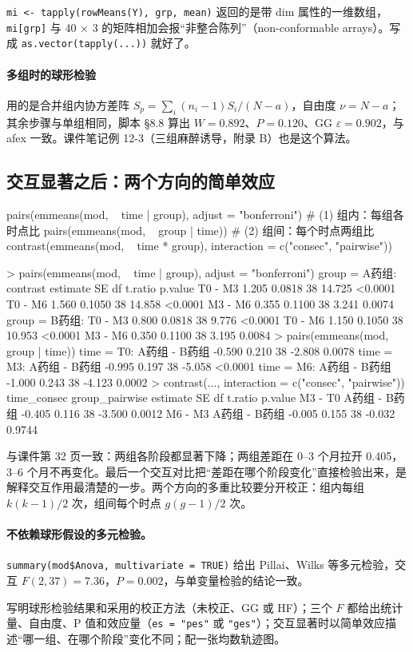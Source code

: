 \begin{notebox}
\Verb|mi <- tapply(rowMeans(Y), grp, mean)| 返回的是带 dim 属性的一维数组，\Verb|mi[grp]| 与 40 × 3 的矩阵相加会报“非整合陈列”（non-conformable arrays）。写成 \Verb|as.vector(tapply(...))| 就好了。
\end{notebox}

\paragraph{多组时的球形检验}用的是合并组内协方差阵 $S_p=\sum_i(n_i-1)S_i/(N-a)$，自由度 $\nu=N-a$；其余步骤与单组相同，脚本 §8.8 算出 $W=0.892$、$P=0.120$、GG $\varepsilon=0.902$，与 afex 一致。课件笔记例 12-3（三组麻醉诱导，附录 B）也是这个算法。

\subsection{交互显著之后：两个方向的简单效应}
\begin{RCode}[R · emmeans]
pairs(emmeans(mod, ~ time | group), adjust = "bonferroni")   # (1) 组内：每组各时点比
pairs(emmeans(mod, ~ group | time))                          # (2) 组间：每个时点两组比
contrast(emmeans(mod, ~ time * group), interaction = c("consec", "pairwise"))
\end{RCode}
\begin{ROut}
> pairs(emmeans(mod, ~ time | group), adjust = "bonferroni")
group = A药组:
 contrast estimate     SE df t.ratio p.value
 T0 - M3     1.205 0.0818 38  14.725 <0.0001
 T0 - M6     1.560 0.1050 38  14.858 <0.0001
 M3 - M6     0.355 0.1100 38   3.241  0.0074
group = B药组:
 T0 - M3     0.800 0.0818 38   9.776 <0.0001
 T0 - M6     1.150 0.1050 38  10.953 <0.0001
 M3 - M6     0.350 0.1100 38   3.195  0.0084
> pairs(emmeans(mod, ~ group | time))
time = T0:   A药组 - B药组   -0.590 0.210 38  -2.808  0.0078
time = M3:   A药组 - B药组   -0.995 0.197 38  -5.058 <0.0001
time = M6:   A药组 - B药组   -1.000 0.243 38  -4.123  0.0002
> contrast(..., interaction = c("consec", "pairwise"))
 time_consec group_pairwise estimate    SE df t.ratio p.value
 M3 - T0     A药组 - B药组    -0.405 0.116 38  -3.500  0.0012
 M6 - M3     A药组 - B药组    -0.005 0.155 38  -0.032  0.9744
\end{ROut}
与课件第 32 页一致：两组各阶段都显著下降；两组差距在 0–3 个月拉开 0.405，3–6 个月不再变化。最后一个交互对比把“差距在哪个阶段变化”直接检验出来，是解释交互作用最清楚的一步。两个方向的多重比较要分开校正：组内每组 $k(k-1)/2$ 次，组间每个时点 $g(g-1)/2$ 次。

\paragraph{不依赖球形假设的多元检验。}\Verb|summary(mod$Anova, multivariate = TRUE)| 给出 Pillai、Wilks 等多元检验，交互 $F(2,37)=7.36$，$P=0.002$，与单变量检验的结论一致。

\begin{resultbox}[重复测量的报告要点]
写明球形检验结果和采用的校正方法（未校正、GG 或 HF）；三个 $F$ 都给出统计量、自由度、P 值和效应量（\Verb|es = "pes"| 或 \Verb|"ges"|）；交互显著时以简单效应描述“哪一组、在哪个阶段”变化不同；配一张均数轨迹图。
\end{resultbox}
